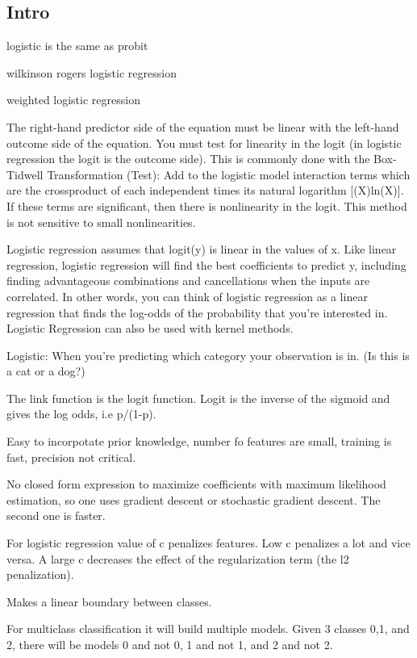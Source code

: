 \documentclass[]{book}
\theoremstyle{definition}
\theoremstyle{definition}
\theoremstyle{definition}
\theoremstyle{remark}
\begin{document}
\subsection{Intro}\label{intro-2}

logistic is the same as probit

wilkinson rogers logistic regression

weighted logistic regression

The right-hand predictor side of the equation must be linear with the
left-hand outcome side of the equation. You must test for linearity in
the logit (in logistic regression the logit is the outcome side). This
is commonly done with the Box-Tidwell Transformation (Test): Add to the
logistic model interaction terms which are the crossproduct of each
independent times its natural logarithm {[}(X)ln(X){]}. If these terms
are significant, then there is nonlinearity in the logit. This method is
not sensitive to small nonlinearities.

Logistic regression assumes that logit(y) is linear in the values of x.
Like linear regression, logistic regression will find the best
coefficients to predict y, including finding advantageous combinations
and cancellations when the inputs are correlated. In other words, you
can think of logistic regression as a linear regression that finds the
log-odds of the probability that you're interested in. Logistic
Regression can also be used with kernel methods.

Logistic: When you're predicting which category your observation is in.
(Is this is a cat or a dog?)

The link function is the logit function. Logit is the inverse of the
sigmoid and gives the log odds, i.e p/(1-p).

Easy to incorpotate prior knowledge, number fo features are small,
training is fast, precision not critical.

No closed form expression to maximize coefficients with maximum
likelihood estimation, so one uses gradient descent or stochastic
gradient descent. The second one is faster.

For logistic regression value of c penalizes features. Low c penalizes a
lot and vice versa. A large c decreases the effect of the regularization
term (the l2 penalization).

Makes a linear boundary between classes.

For multiclass classification it will build multiple models. Given 3
classes 0,1, and 2, there will be models 0 and not 0, 1 and not 1, and 2
and not 2.
\end{document}
